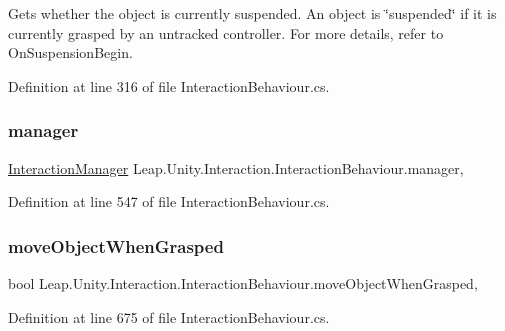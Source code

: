 Gets whether the object is currently suspended. An object is \char`\"{}suspended\char`\"{} if it is currently grasped by an untracked controller. For more details, refer to On\+Suspension\+Begin. 



Definition at line 316 of file Interaction\+Behaviour.\+cs.

\mbox{\label{class_leap_1_1_unity_1_1_interaction_1_1_interaction_behaviour_af612da311eae4f7df7becea9aae8f7b7}} 
\subsubsection{\texorpdfstring{manager}{manager}}
{\footnotesize\ttfamily \mbox{\hyperlink{class_leap_1_1_unity_1_1_interaction_1_1_interaction_manager}{Interaction\+Manager}} Leap.\+Unity.\+Interaction.\+Interaction\+Behaviour.\+manager\hspace{0.3cm}{\ttfamily [get]}, {\ttfamily [set]}}



Definition at line 547 of file Interaction\+Behaviour.\+cs.

\mbox{\label{class_leap_1_1_unity_1_1_interaction_1_1_interaction_behaviour_a5fc6eab23862e17b78936e29a31cbd7c}} 
\subsubsection{\texorpdfstring{moveObjectWhenGrasped}{moveObjectWhenGrasped}}
{\footnotesize\ttfamily bool Leap.\+Unity.\+Interaction.\+Interaction\+Behaviour.\+move\+Object\+When\+Grasped\hspace{0.3cm}{\ttfamily [get]}, {\ttfamily [set]}}



Definition at line 675 of file Interaction\+Behaviour.\+cs.

